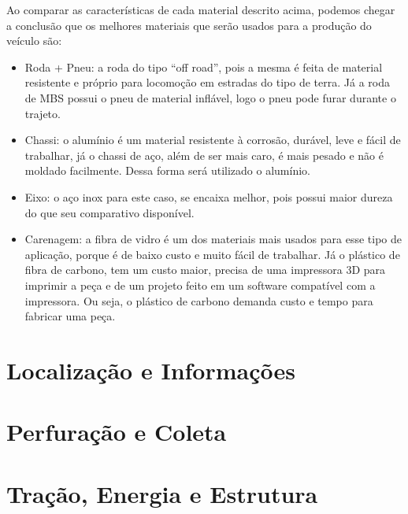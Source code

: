   Ao comparar as características de cada material descrito acima, podemos chegar a conclusão que os melhores materiais que 
  serão usados para a produção do veículo são:
  
  \begin{itemize}
    \item Roda + Pneu: a roda do tipo “off road”, pois a mesma é feita de material resistente e próprio para locomoção em estradas do tipo de terra. Já a roda de MBS possui o pneu de material inflável, logo o pneu pode furar durante o trajeto.
    \item Chassi: o alumínio é um material resistente à corrosão, durável, leve e fácil de trabalhar, já o chassi de aço, além de ser mais caro, é mais pesado e não é moldado facilmente. Dessa forma será utilizado o alumínio.
    \item Eixo: o aço inox para este caso, se encaixa melhor, pois possui maior dureza do que seu comparativo disponível.
    \item Carenagem: a fibra de vidro é um dos materiais mais usados para esse tipo de aplicação, porque é de baixo custo e muito fácil de trabalhar. Já o plástico de fibra de carbono, tem um custo maior, precisa de uma impressora 3D para imprimir a peça e de um projeto feito em um software compatível com a  impressora. Ou seja, o plástico de carbono demanda custo e tempo para fabricar uma peça.
  \end{itemize}
  
  
  
 
  \section{Localização e Informações}

  \section{Perfuração e Coleta}

  \section{Tração, Energia e Estrutura}
